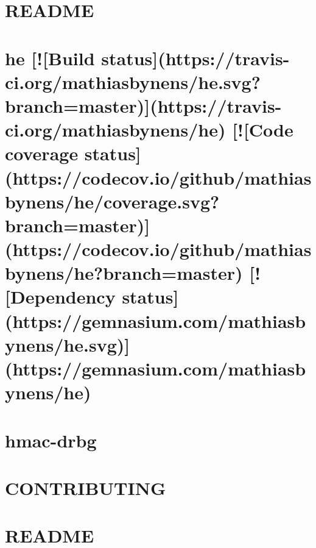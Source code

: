 \documentclass[twoside]{book}
\newcommand{\+}{\discretionary{\mbox{\scriptsize$\hookleftarrow$}}{}{}}
\begin{document}
\chapter{R\+E\+A\+D\+ME}
\label{md__c_1_workspace_demo_src_main_script_node_modules_hawk__r_e_a_d_m_e}

\chapter{he \mbox{[}!\mbox{[}Build status\mbox{]}(https\+://travis-\/ci.org/mathiasbynens/he.svg?branch=master)\mbox{]}(https\+://travis-\/ci.org/mathiasbynens/he) \mbox{[}!\mbox{[}Code coverage status\mbox{]}(https\+://codecov.io/github/mathiasbynens/he/coverage.svg?branch=master)\mbox{]}(https\+://codecov.io/github/mathiasbynens/he?branch=master) \mbox{[}!\mbox{[}Dependency status\mbox{]}(https\+://gemnasium.com/mathiasbynens/he.svg)\mbox{]}(https\+://gemnasium.com/mathiasbynens/he)}
\label{md__c_1_workspace_demo_src_main_script_node_modules_he__r_e_a_d_m_e}

\chapter{hmac-\/drbg}
\label{md__c_1_workspace_demo_src_main_script_node_modules_hmac-drbg__r_e_a_d_m_e}

\chapter{C\+O\+N\+T\+R\+I\+B\+U\+T\+I\+NG}
\label{md__c_1_workspace_demo_src_main_script_node_modules_hoek__c_o_n_t_r_i_b_u_t_i_n_g}

\chapter{R\+E\+A\+D\+ME}
\label{md__c_1_workspace_demo_src_main_script_node_modules_hoek__r_e_a_d_m_e}

\end{document}
